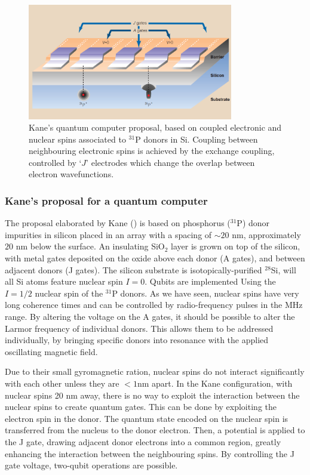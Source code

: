 \documentclass[a4paper,11pt]{article}
\begin{document}
\begin{figure}[h]
\centering
\includegraphics[width = 0.8\textwidth]{figures/kane_QC.png}
\caption{Kane's quantum computer proposal, based on coupled electronic and nuclear spins associated to $^{31}$P donors in Si. Coupling between neighbouring electronic spins is achieved by the exchange coupling, controlled by `$J$' electrodes which change the overlap between electron wavefunctions.}
\label{fig:kane}
\end{figure}

\subsubsection{Kane's proposal for a quantum computer}
The proposal elaborated by Kane (\cite{kane_silicon-based_1998}) is based on phosphorus ($^{31}$P) donor impurities in silicon placed in an array with a spacing of $\sim 20$ nm, approximately $20$ nm below the surface. An insulating SiO$_2$ layer is grown on top of the silicon, with metal gates deposited on the oxide above each donor (A gates), and between adjacent donors (J gates).
\newline The silicon substrate is isotopically-purified $^{28}$Si, will all Si atoms feature nuclear spin $I = 0$. Qubits are implemented Using the $I=1/2$ nuclear spin of the $^{31}$P donors. As we have seen, nuclear spins have very long coherence times and can be controlled by radio-frequency pulses in the MHz range. 
By altering the voltage on the A gates, it should be possible to alter the Larmor frequency of individual donors. This allows them to be addressed individually, by bringing specific donors into resonance with the applied oscillating magnetic field.


Due to their small gyromagnetic ration, nuclear spins do not interact significantly with each other unless they are $<1$nm apart. In the Kane configuration, with nuclear spins 20 nm away, there is no way to exploit the interaction between the nuclear spins to create quantum gates. This can be done by exploiting the electron spin in the donor. The quantum state encoded on the nuclear spin is transferred from the nucleus to the donor electron. Then, a potential is applied to the J gate, drawing adjacent donor electrons into a common region, greatly enhancing the interaction between the neighbouring spins. By controlling the J gate voltage, two-qubit operations are possible.
\end{document}
